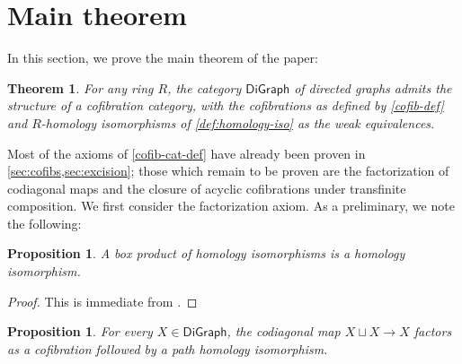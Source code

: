 \documentclass[11pt]{article}
\newtheorem{proposition}[theo]{Proposition}
\newtheorem{theorem}[theo]{Theorem}
\theoremstyle{definition}
\numberwithin{equation}{section}
\newcommand{\DiGraph}{\mathsf{DiGraph}}
\begin{document}
\section{Main theorem}\label{sec:main-thm}

In this section, we prove the main theorem of the paper:

\begin{theorem} \label{cofib-cat}
For any ring $R$, the category $\DiGraph$ of directed graphs admits the structure of a cofibration category, with the cofibrations as defined by \cref{cofib-def} and $R$-homology isomorphisms of \cref{def:homology-iso} as the weak equivalences.
\end{theorem}

Most of the axioms of \cref{cofib-cat-def} have already been proven in \cref{sec:cofibs,sec:excision}; those which remain to be proven are the factorization of codiagonal maps and the closure of acyclic cofibrations under transfinite composition. We first consider the factorization axiom. As a preliminary, we note the following:

\begin{proposition}\label{box-prod-weqs}
A box product of homology isomorphisms is a homology isomorphism.
\end{proposition}

\begin{proof}
This is immediate from \cite[Thm.~4.7]{grigor'yan-muranov-yau}.
\end{proof}

\begin{proposition}\label{codiag-factor}
For every $X \in \DiGraph$, the codiagonal map $X \sqcup X \to X$ factors as a cofibration followed by a path homology isomorphism.
\end{proposition}
\end{document}
